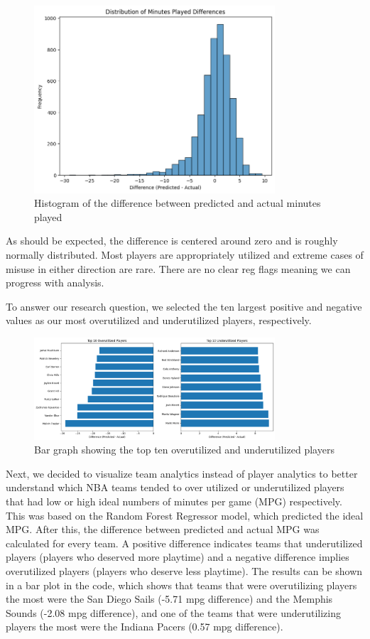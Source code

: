 \documentclass[12pt]{article}
\begin{document}
\begin{figure}[H]
    \centering
    \includegraphics[width=0.8\textwidth]{MM_EP_DMPD.png}
    \caption{Histogram of the difference between predicted and actual minutes played}
\end{figure}
As should be expected, the difference is centered around zero and is roughly normally distributed. Most players are appropriately utilized and extreme cases of misuse in either direction are rare. There are no clear reg flags meaning we can progress with analysis. 

To answer our research question, we selected the ten largest positive and negative values as our most overutilized and underutilized players, respectively.  

\begin{figure}[H]
    \centering
    \includegraphics[width=0.8\textwidth]{MM_EP_TOP_TEN.png}
    \caption{Bar graph showing the top ten overutilized and underutilized players}
    \label{fig:minutes_decision_tree}
\end{figure}

Next, we decided to visualize team analytics instead of player analytics to better understand which NBA teams tended to over utilized or underutilized players that had low or high ideal numbers of minutes per game (MPG) respectively. This was based on the Random Forest Regressor model, which predicted the ideal MPG. After this, the difference between predicted and actual MPG was calculated for every team. A positive difference indicates teams that underutilized players (players who deserved more playtime) and a negative difference implies overutilized players (players who deserve less playtime). The results can be shown in a bar plot in the code, which shows that teams that were overutilizing players the most were the San Diego Sails (-5.71 mpg difference) and the Memphis Sounds (-2.08 mpg difference), and one of the teams that were underutilizing players the most were the Indiana Pacers (0.57 mpg difference).
\end{document}
